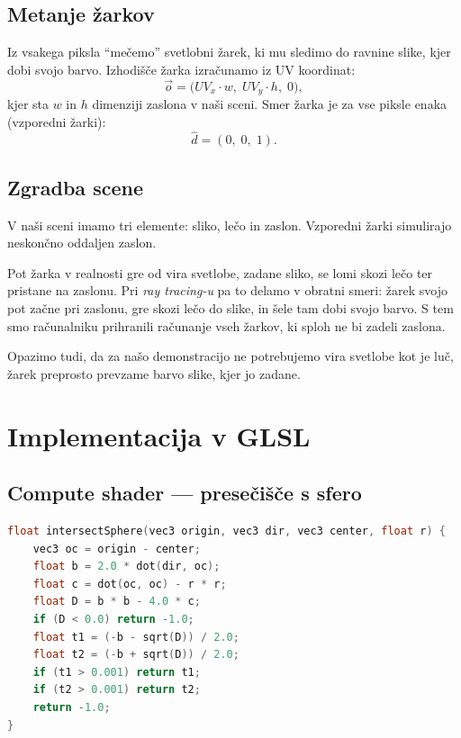 \documentclass[a4paper,12pt]{article}
\begin{document}
    \subsection{Metanje žarkov}

    Iz vsakega piksla ``mečemo'' svetlobni žarek, ki mu sledimo do ravnine slike, kjer dobi svojo barvo.
    Izhodišče žarka izračunamo iz UV koordinat:
    \[
        \vec{o} = \bigl(UV_x \cdot w,\; UV_y \cdot h,\; 0\bigr),
    \]
    kjer sta $w$ in $h$ dimenziji zaslona v naši sceni.
    Smer žarka je za vse piksle enaka (vzporedni žarki):
    \[
        \hat{d} = (0,\; 0,\; 1).
    \]

    \subsection{Zgradba scene}

    V naši sceni imamo tri elemente: sliko, lečo in zaslon.
    Vzporedni žarki simulirajo neskončno oddaljen zaslon.

    Pot žarka v realnosti gre od vira svetlobe, zadane sliko, se lomi skozi lečo ter pristane na zaslonu.
    Pri \emph{ray tracing-u} pa to delamo v obratni smeri:
    žarek svojo pot začne pri zaslonu, gre skozi lečo do slike, in šele tam dobi svojo barvo.
    S tem smo računalniku prihranili računanje vseh žarkov, ki sploh ne bi zadeli zaslona.

    Opazimo tudi, da za našo demonstracijo ne potrebujemo vira svetlobe kot je luč, žarek preprosto prevzame barvo slike, kjer jo zadane.

    \section{Implementacija v GLSL}

    \subsection{Compute shader — presečišče s sfero}


    \begin{lstlisting}[language=C, caption={Presečišče žarka s sfero v GLSL}]
float intersectSphere(vec3 origin, vec3 dir, vec3 center, float r) {
    vec3 oc = origin - center;
    float b = 2.0 * dot(dir, oc);
    float c = dot(oc, oc) - r * r;
    float D = b * b - 4.0 * c;
    if (D < 0.0) return -1.0;
    float t1 = (-b - sqrt(D)) / 2.0;
    float t2 = (-b + sqrt(D)) / 2.0;
    if (t1 > 0.001) return t1;
    if (t2 > 0.001) return t2;
    return -1.0;
}
    \end{lstlisting}
\end{document}
